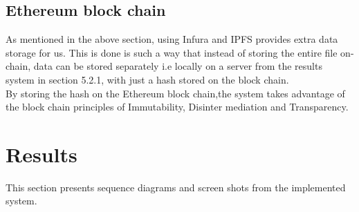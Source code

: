 \subsection{Ethereum block chain}
As mentioned in the above section, using Infura and IPFS provides extra data storage for us. This is done is such a way that instead of storing the entire file on-chain, data can be stored separately i.e locally on a server from the results system in section 5.2.1, with just a hash stored on the block chain.\\By storing the hash on the Ethereum block chain,the system takes advantage of the block chain principles of Immutability, Disinter mediation and Transparency.

\section{Results}
This section presents sequence diagrams and screen shots from the implemented system.
